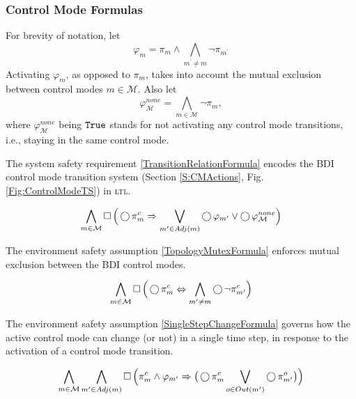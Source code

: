 
\subsubsection{Control Mode Formulas}

For brevity of notation, let $$\varphi_m = \pi_m \wedge \bigwedge_{m^\prime \neq m} \lnot \pi_{m^\prime}$$
Activating $\varphi_m$, as opposed to $\pi_m$, takes into account the mutual exclusion between control modes $m \in \mathcal{M}$.
Also let $$\varphi_\mathcal{M}^{none} = \bigwedge_{m \in \mathcal{M}} \lnot \pi_m,$$
where $\varphi_\mathcal{M}^{none}$ being $\mathtt{True}$ stands for not activating any control mode transitions, i.e., staying in the same control mode.

The system safety requirement \eqref{TransitionRelationFormula} encodes the BDI control mode transition system (Section \ref{S:CMActions}, Fig. \ref{Fig:ControlModeTS}) in \textsc{ltl}.

\begin{equation}\label{TransitionRelationFormula}
	\bigwedge \limits_{m \in \mathcal{M}} \operatorname{\Box} \Big( \operatorname{\bigcirc} \pi_m^c \Rightarrow \bigvee \limits_{m^\prime \in Adj(m)} \operatorname{\bigcirc} \varphi_{m^\prime} \vee \operatorname{\bigcirc} \varphi_\mathcal{M}^{none} \Big)
\end{equation}

The environment safety assumption \eqref{TopologyMutexFormula} enforces mutual exclusion between the BDI control modes.

\begin{equation}\label{TopologyMutexFormula}
	\bigwedge \limits_{m \in \mathcal{M}} \operatorname{\Box} \Big( \operatorname{\bigcirc} \pi_m^c \Leftrightarrow \bigwedge \limits_{m^\prime \neq m} \operatorname{\bigcirc} \lnot \pi_{m^\prime}^c \Big)
\end{equation}

The environment safety assumption \eqref{SingleStepChangeFormula} governs how the active control mode can change (or not) in a single time step, in response to the activation of a control mode transition.

\begin{equation}\label{SingleStepChangeFormula}
	\bigwedge \limits_{m \in \mathcal{M}} \bigwedge \limits_{m^\prime \in Adj(m)} \operatorname{\Box} \Big( \pi_m^c \wedge  \varphi_{m^\prime} \Rightarrow \big( \operatorname{\bigcirc} \pi_{m}^c \bigvee \limits_{o \in Out(m^\prime)} \operatorname{\bigcirc} \pi_{m^\prime}^o \big) \Big)
\end{equation}

%

